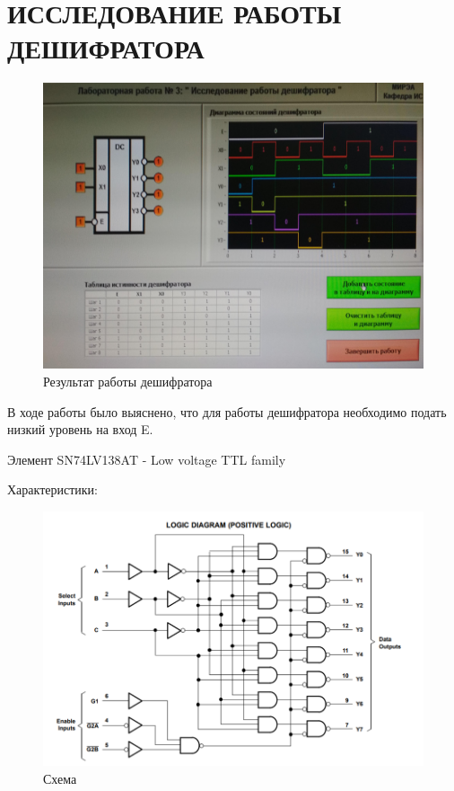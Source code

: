 \section{ИССЛЕДОВАНИЕ РАБОТЫ ДЕШИФРАТОРА}

\begin{figure}[H]
	\centering
	\includegraphics[width=0.95\linewidth]{imgs/3/1}
	\caption{Результат работы дешифратора}
	\label{fig:3_}
\end{figure}

В ходе работы было выяснено, что для работы дешифратора необходимо подать низкий уровень на вход E.

Элемент SN74LV138AT - Low voltage TTL family

Характеристики:

\begin{figure}[H]
	\centering
	\includegraphics[width=0.95\linewidth]{imgs/3/ti1}
	\caption{Схема}
	\label{fig:3_ti1}
\end{figure}

